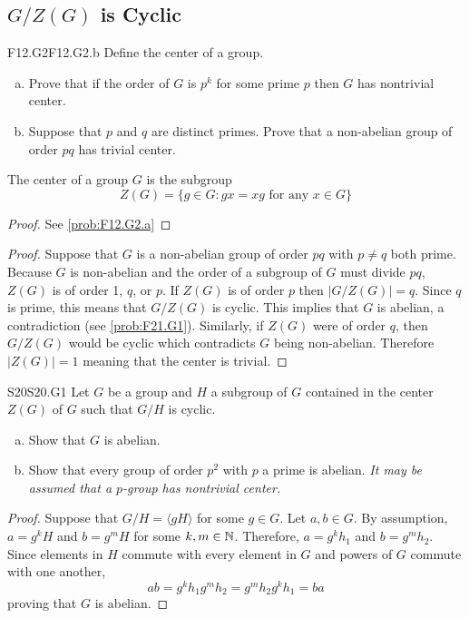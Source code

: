 \documentclass[../../AlgebraQualSolutions.tex]{subfiles}
\begin{document}
\subsection{$G/Z(G)$ is Cyclic}

	\begin{prob}{F12.G2}{F12.G2.b}
	Define the center of a group.
	\begin{enumerate}[(a)]
	\item Prove that if the order of $G$ is $p^k$ for some prime $p$ then $G$ has nontrivial center.
	\item Suppose that $p$ and $q$ are distinct primes. Prove that a non-abelian group of order $pq$ has trivial center.
	\end{enumerate}
	\end{prob}
	
	The center of a group $G$ is the subgroup
		\[Z(G) = \{g \in G: gx = xg \textrm{ for any $x \in G$} \} \]
	
	\begin{proof}
		See \ref{prob:F12.G2.a}
	\end{proof}

	\begin{proof}
		Suppose that $G$ is a non-abelian group of order $pq$ with $p \neq q$ both prime. Because $G$ is non-abelian and the order of a subgroup of $G$ must divide $pq$, $Z(G)$ is of order 1, $q$, or $p$. If $Z(G)$ is of order $p$ then $|G/Z(G)| = q$. Since $q$ is prime, this means that $G/Z(G)$ is cyclic. This implies that $G$ is abelian, a contradiction (see \ref{prob:F21.G1}). Similarly, if $Z(G)$ were of order $q$, then $G/Z(G)$ would be cyclic which contradicts $G$ being non-abelian. Therefore $|Z(G)| = 1$ meaning that the center is trivial.
	\end{proof}

	\begin{prob}{S20}{S20.G1}
	Let $G$ be a group and $H$ a subgroup of $G$ contained in the center $Z(G)$ of $G$ such that $G/H$ is cyclic.
	\begin{enumerate}[(a)]
	\item Show that $G$ is abelian.
	\item Show that every group of order $p^2$ with $p$ a prime is abelian. \emph{It may be assumed that a $p$-group has nontrivial center.}
	\end{enumerate}
	\end{prob}
	
	\begin{proof}
	Suppose that $G/H = \langle gH \rangle$ for some $g \in G$. Let $a, b \in G$. By assumption, $a = g^kH$ and $b = g^mH$ for some $k,m \in \mathbb{N}$. Therefore, $a = g^kh_1$ and $b= g^m h_2$. Since elements in $H$ commute with every element in $G$ and powers of $G$ commute with one another,
		\[ab = g^kh_1g^mh_2 = g^mh_2g^k h_1 = ba \]
	proving that $G$ is abelian.
	\end{proof}
	
\end{document}
